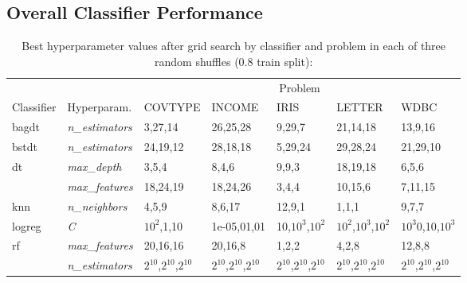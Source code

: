 \documentclass[twoside,11pt]{article}
\begin{document}
		\subsection{Overall Classifier Performance}
			
			\begin{table}[ph!]
				\caption{Best hyperparameter values after grid search by classifier and problem in each of three random shuffles (0.8 train split):}
				\label{tab:best_hyperparams_by_problem_shuffles}
				\begin{tabular}{lllllll}
					\toprule
					& & \multicolumn{5}{c}{Problem} \\\cline{3-7}
					Classifier & Hyperparam. &         COVTYPE &           INCOME &               IRIS &              LETTER &                 WDBC \\
					\midrule
					bagdt & \textit{n\_estimators} &         3,27,14 &         26,25,28 &             9,29,7 &            21,14,18 &              13,9,16 \\
					bstdt & \textit{n\_estimators}  &        24,19,12 &         28,18,18 &            5,29,24 &            29,28,24 &             21,29,10 \\
					\multirow{2}{*}{dt} & \textit{max\_depth} &           3,5,4 &            8,4,6 &              9,9,3 &            18,19,18 &                6,5,6 \\
					& \textit{max\_features} &        18,24,19 &         18,24,26 &              3,4,4 &             10,15,6 &              7,11,15 \\
					knn & \textit{n\_neighbors} &           4,5,9 &           8,6,17 &             12,9,1 &               1,1,1 &                9,7,7 \\
					logreg & \textit{C} &  $10^2$,1,10 &  1e-05,01,01 &  10,$10^3$,$10^2$ &  $10^2$,$10^3$,$10^2$ &  $10^3$0,10,$10^3$ \\
					\multirow{2}{*}{rf} & \textit{max\_features} &        20,16,16 &          20,16,8 &              1,2,2 &               4,2,8 &               12,8,8 \\
					& \textit{n\_estimators} &  $2^{10}$,$2^{10}$,$2^{10}$ &   $2^{10}$,$2^{10}$,$2^{10}$ &     $2^{10}$,$2^{10}$,$2^{10}$ &      $2^{10}$,$2^{10}$,$2^{10}$ &       $2^{10}$,$2^{10}$,$2^{10}$ \\
					\bottomrule
				\end{tabular}
			
			\end{table}
			
\end{document}
